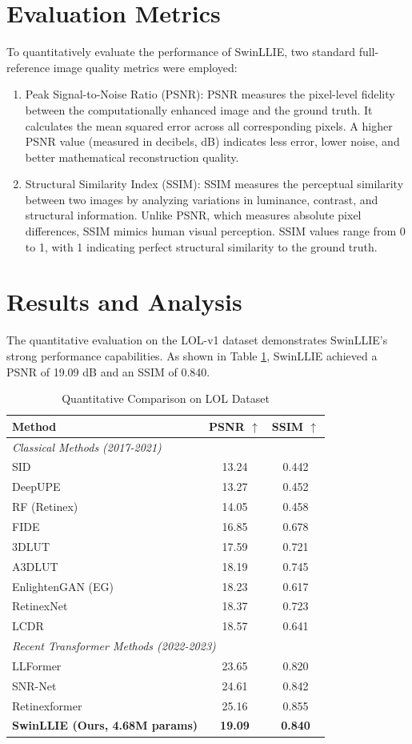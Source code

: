 \documentclass[12pt, a4paper]{report}
\begin{document}
\section{Evaluation Metrics}
To quantitatively evaluate the performance of SwinLLIE, two standard full-reference image quality metrics were employed:
\begin{enumerate}
    \item Peak Signal-to-Noise Ratio (PSNR): PSNR measures the pixel-level fidelity between the computationally enhanced image and the ground truth. It calculates the mean squared error across all corresponding pixels. A higher PSNR value (measured in decibels, dB) indicates less error, lower noise, and better mathematical reconstruction quality.
    \item Structural Similarity Index (SSIM): SSIM measures the perceptual similarity between two images by analyzing variations in luminance, contrast, and structural information. Unlike PSNR, which measures absolute pixel differences, SSIM mimics human visual perception. SSIM values range from 0 to 1, with 1 indicating perfect structural similarity to the ground truth.
\end{enumerate}

\section{Results and Analysis}
The quantitative evaluation on the LOL-v1 dataset demonstrates SwinLLIE's strong performance capabilities. As shown in Table \ref{tab:results}, SwinLLIE achieved a PSNR of 19.09 dB and an SSIM of 0.840.

\begin{table}[htbp]
\caption{Quantitative Comparison on LOL Dataset}
\centering
\begin{tabular}{lcc}
\toprule
\textbf{Method} & \textbf{PSNR $\uparrow$} & \textbf{SSIM $\uparrow$} \\
\midrule
\multicolumn{3}{l}{\textit{Classical Methods (2017-2021)}} \\
SID & 13.24 & 0.442 \\
DeepUPE & 13.27 & 0.452 \\
RF (Retinex) & 14.05 & 0.458 \\
FIDE & 16.85 & 0.678 \\
3DLUT & 17.59 & 0.721 \\
A3DLUT & 18.19 & 0.745 \\
EnlightenGAN (EG) & 18.23 & 0.617 \\
RetinexNet & 18.37 & 0.723 \\
LCDR & 18.57 & 0.641 \\
\midrule
\multicolumn{3}{l}{\textit{Recent Transformer Methods (2022-2023)}} \\
LLFormer & 23.65 & 0.820 \\
SNR-Net & 24.61 & 0.842 \\
Retinexformer & 25.16 & 0.855 \\
\midrule
\textbf{SwinLLIE (Ours, 4.68M params)} & \textbf{19.09} & \textbf{0.840} \\
\bottomrule
\end{tabular}
\label{tab:results}
\end{table}
\end{document}
